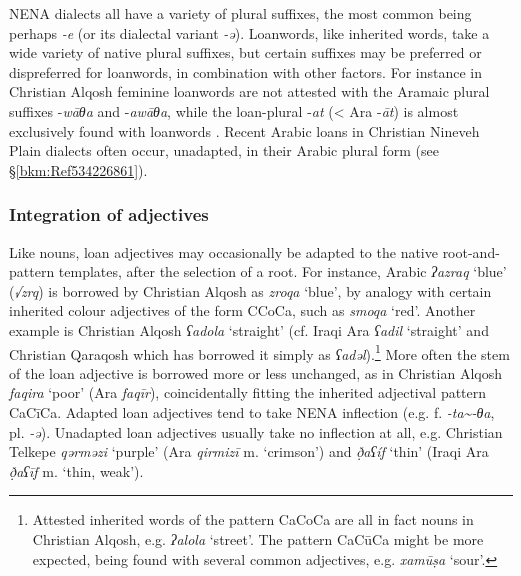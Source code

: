\documentclass[output=paper]{langsci/langscibook}
\begin{document}
NENA dialects all have a variety of plural suffixes, the most common being perhaps \textit{\nobreakdash-e} (or its dialectal variant \textit{\nobreakdash-ə}). Loanwords, like inherited words, take a wide variety of native plural suffixes, but certain suffixes may be preferred or dispreferred for loanwords, in combination with other factors. For instance in Christian Alqosh feminine loanwords are not attested with the Aramaic plural suffixes \nobreakdash-\textit{wāθa} and \nobreakdash-\textit{awāθa}, while the loan-plural \nobreakdash-\textit{at} (< Ara \nobreakdash-\textit{āt}) is almost exclusively found with loanwords \citep[347]{Coghill2005}. Recent Arabic loans in Christian Nineveh Plain dialects often occur, unadapted, in their Arabic plural form (see §\ref{bkm:Ref534226861}).

\subsubsection{Integration of adjectives}

Like nouns, loan adjectives may occasionally be adapted to the native root-and-pattern templates, after the selection of a root. For instance, Arabic \textit{ʔazraq} ‘blue’ (\textit{√zrq}) is borrowed by Christian Alqosh as \textit{zroqa} ‘blue’, by analogy with certain inherited colour adjectives of the form CCoCa, such as \textit{smoqa} ‘red’. Another example is Christian Alqosh \textit{ʕadola} ‘straight’ (cf. Iraqi Ara \textit{ʕadil} ‘straight’ and Christian Qaraqosh which has borrowed it simply as \textit{ʕadəl}).\footnote{Attested inherited words of the pattern CaCoCa are all in fact nouns in Christian Alqosh, e.g. \textit{ʔalola} ‘street’. The pattern CaCūCa might be more expected, being found with several common adjectives, e.g. \textit{xamūṣa} ‘sour’.} More often the stem of the loan adjective is borrowed more or less unchanged, as in Christian Alqosh \textit{faqira} ‘poor’ (Ara \textit{faqīr}), coincidentally fitting the inherited adjectival pattern CaCīCa. Adapted loan adjectives tend to take NENA inflection (e.g. f. \textit{{}-ta{\textasciitilde}-θa}, pl. \textit{{}-ə}). Unadapted loan adjectives usually take no inflection at all, e.g. Christian Telkepe \textit{qərməzi} ‘purple’ (Ara \textit{qirmizī} m. ‘crimson’) and \textit{ð̣aʕíf} ‘thin’ (Iraqi Ara \textit{ð̣aʕīf} m. ‘thin, weak’).
\end{document}

